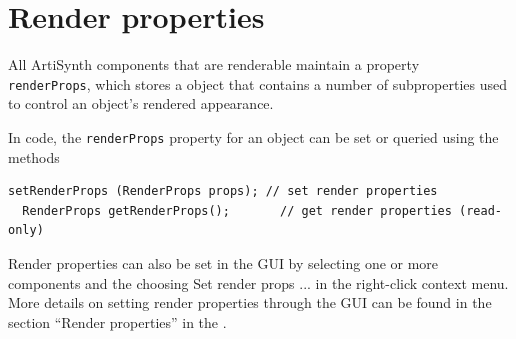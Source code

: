 
%
%


\section{Render properties}
\label{RenderProperties:sec}

All ArtiSynth components that are renderable maintain a property {\tt
renderProps}, which stores a
 object that contains a number
of subproperties used to control an object's rendered appearance.

In code, the {\tt renderProps} property for an object can be set or
queried using the methods
%
\begin{lstlisting}[]
  setRenderProps (RenderProps props); // set render properties
  RenderProps getRenderProps();       // get render properties (read-only)
\end{lstlisting}
%
Render properties can also be set in the GUI by selecting one or more
components and the choosing {\sf Set render props ...}  in the
right-click context menu. More details on setting render properties
through the GUI can be found in the section ``Render properties'' in the
.

